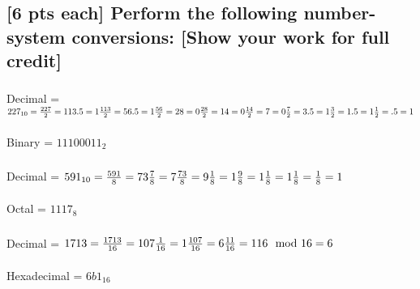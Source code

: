 \documentclass[12pt]{article}
\begin{document}
\subsection{[6 pts each] Perform the following number-system conversions: [Show your work for full credit]}
\subsubsection{}
Decimal = $ 227_{10} =\\ \\
\frac{227}{2} = 113.5 = 1\\ \\
\frac{113}{2} = 56.5 = 1\\ \\
\frac{56}{2} = 28 = 0 \\ \\
\frac{28}{2} = 14 = 0 \\ \\
\frac{14}{2} = 7 = 0 \\ \\
\frac{7}{2} = 3.5 = 1 \\ \\
\frac{3}{2} = 1.5 = 1 \\ \\
\frac{1}{2} = .5 = 1$\\ \\
Binary = $11100011_2$     
\subsubsection{}
Decimal = $591_{10} =\\ \\
\frac{591}{8} = 73\frac{7}{8} = 7 \\ \\
\frac{73}{8} = 9\frac{1}{8} = 1 \\ \\
\frac{9}{8} = 1\frac{1}{8} = 1 \\ \\
\frac{1}{8} = \frac{1}{8} = 1$ \\ \\
Octal = $1117_8$
\subsubsection{}
Decimal = $1713 =\\ \\
\frac{1713}{16} = 107\frac{1}{16} = 1 \\ \\
\frac{107}{16} = 6\frac{11}{16} = 11 \\ \\
{6}\mod{16} = 6$ \\ \\
Hexadecimal = $6b1_{16}$
\end{document}
